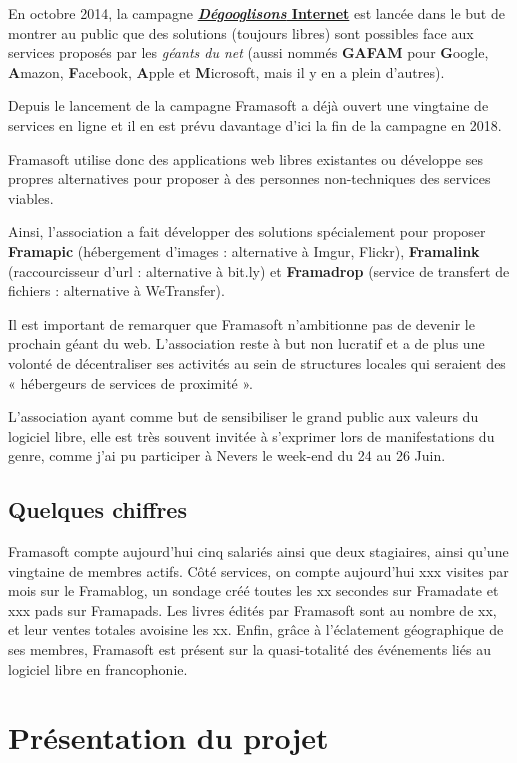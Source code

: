 \documentclass[10pt,a4paper]{report}
\begin{document}
	En octobre 2014, la campagne \href{https://degooglisons-internet.org/}{\textbf{\textit{Dégooglisons} Internet}} est lancée dans le but de montrer au public que des solutions (toujours libres) sont possibles face aux services proposés par les \textit{géants du net} (aussi nommés \textbf{GAFAM} pour \textbf{G}oogle, \textbf{A}mazon, \textbf{F}acebook, \textbf{A}pple et \textbf{M}icrosoft, mais il y en a plein d'autres).
	
	Depuis le lancement de la campagne Framasoft a déjà ouvert une vingtaine de services en ligne et il en est prévu davantage d'ici la fin de la campagne en 2018.
	
	Framasoft utilise donc des applications web libres existantes ou développe ses propres alternatives pour proposer à des personnes non-techniques des services viables.
	
	Ainsi, l'association a fait développer des solutions spécialement pour proposer \textbf{Framapic} (hébergement d'images : alternative à Imgur, Flickr), \textbf{Framalink} (raccourcisseur d'url : alternative à bit.ly) et \textbf{Framadrop} (service de transfert de fichiers : alternative à WeTransfer).
	
	Il est important de remarquer que Framasoft n'ambitionne pas de devenir le prochain géant du web. L'association reste à but non lucratif et a de plus une volonté de décentraliser ses activités au sein de structures locales qui seraient des « hébergeurs de services de proximité ».
	
	L'association ayant comme but de sensibiliser le grand public aux valeurs du logiciel libre, elle est très souvent invitée à s'exprimer lors de manifestations du genre, comme j'ai pu participer à Nevers le week-end du 24 au 26 Juin.
	
	\subsection{Quelques chiffres}
	Framasoft compte aujourd'hui cinq salariés ainsi que deux stagiaires, ainsi qu'une vingtaine de membres actifs. Côté services, on compte aujourd'hui xxx visites par mois sur le Framablog, un sondage créé toutes les xx secondes sur Framadate et xxx pads sur Framapads. Les livres édités par Framasoft sont au nombre de xx, et leur ventes totales avoisine les xx. Enfin, grâce à l'éclatement géographique de ses membres, Framasoft est présent sur la quasi-totalité des événements liés au logiciel libre en francophonie.
	
	\section{Présentation du projet}
	
\end{document}
